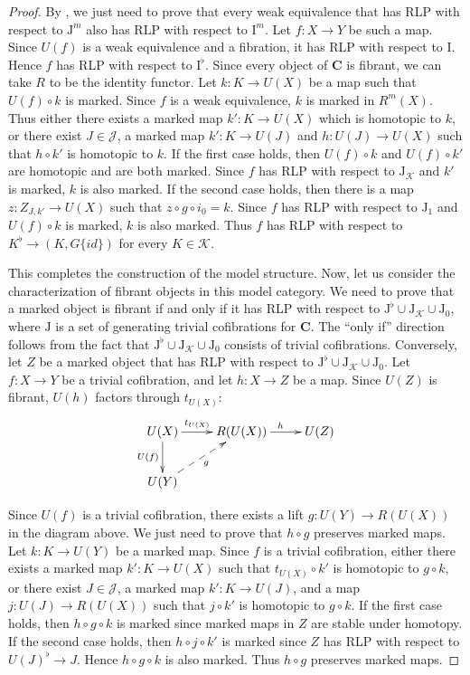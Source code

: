 \documentclass[reqno]{amsart}
\theoremstyle{definition}
\theoremstyle{remark}
\newcommand{\cat}[1]{\mathbf{#1}}
\newcommand{\C}{\cat{C}}
\newcommand{\I}{\mathrm{I}}
\newcommand{\J}{\mathrm{J}}
\numberwithin{figure}{section}
\begin{document}
\begin{proof}
By , we just need to prove that every weak equivalence that has RLP with respect to $\J^m$ also has RLP with respect to $\I^m$.
Let $f : X \to Y$ be such a map.
Since $U(f)$ is a weak equivalence and a fibration, it has RLP with respect to $\I$.
Hence $f$ has RLP with respect to $\I^\flat$.
Since every object of $\C$ is fibrant, we can take $R$ to be the identity functor.
Let $k : K \to U(X)$ be a map such that $U(f) \circ k$ is marked.
Since $f$ is a weak equivalence, $k$ is marked in $R^m(X)$.
Thus either there exists a marked map $k' : K \to U(X)$ which is homotopic to $k$,
or there exist $J \in \mathcal{J}$, a marked map $k' : K \to U(J)$ and $h : U(J) \to U(X)$ such that $h \circ k'$ is homotopic to $k$.
If the first case holds, then $U(f) \circ k$ and $U(f) \circ k'$ are homotopic and are both marked.
Since $f$ has RLP with respect to $\J_\mathcal{K}$ and $k'$ is marked, $k$ is also marked.
If the second case holds, then there is a map $z : Z_{J,k'} \to U(X)$ such that $z \circ g \circ i_0 = k$.
Since $f$ has RLP with respect to $\J_1$ and $U(f) \circ k$ is marked, $k$ is also marked.
Thus $f$ has RLP with respect to $K^\flat \to (K, G \{id\})$ for every $K \in \mathcal{K}$.

This completes the construction of the model structure.
Now, let us consider the characterization of fibrant objects in this model category.
We need to prove that a marked object is fibrant if and only if it has RLP with respect to $\J^\flat \cup \J_\mathcal{K} \cup \J_0$,
where $\J$ is a set of generating trivial cofibrations for $\C$.
The ``only if'' direction follows from the fact that $\J^\flat \cup \J_\mathcal{K} \cup \J_0$ consists of trivial cofibrations.
Conversely, let $Z$ be a marked object that has RLP with respect to $\J^\flat \cup \J_\mathcal{K} \cup \J_0$.
Let $f : X \to Y$ be a trivial cofibration, and let $h : X \to Z$ be a map.
Since $U(Z)$ is fibrant, $U(h)$ factors through $t_{U(X)}$:
\[ \xymatrix{ U(X) \ar[r]^-{t_{U(X)}} \ar[d]_{U(f)} & R(U(X)) \ar[r]^h & U(Z) \\
              U(Y) \ar@{-->}[ur]_g
            } \]

Since $U(f)$ is a trivial cofibration, there exists a lift $g : U(Y) \to R(U(X))$ in the diagram above.
We just need to prove that $h \circ g$ preserves marked maps.
Let $k : K \to U(Y)$ be a marked map.
Since $f$ is a trivial cofibration, either there exists a marked map $k' : K \to U(X)$ such that $t_{U(X)} \circ k'$ is homotopic to $g \circ k$,
or there exist $J \in \mathcal{J}$, a marked map $k' : K \to U(J)$, and a map $j : U(J) \to R(U(X))$ such that $j \circ k'$ is homotopic to $g \circ k$.
If the first case holds, then $h \circ g \circ k$ is marked since marked maps in $Z$ are stable under homotopy.
If the second case holds, then $h \circ j \circ k'$ is marked since $Z$ has RLP with respect to $U(J)^\flat \to J$.
Hence $h \circ g \circ k$ is also marked.
Thus $h \circ g$ preserves marked maps.


\end{proof}
\end{document}

